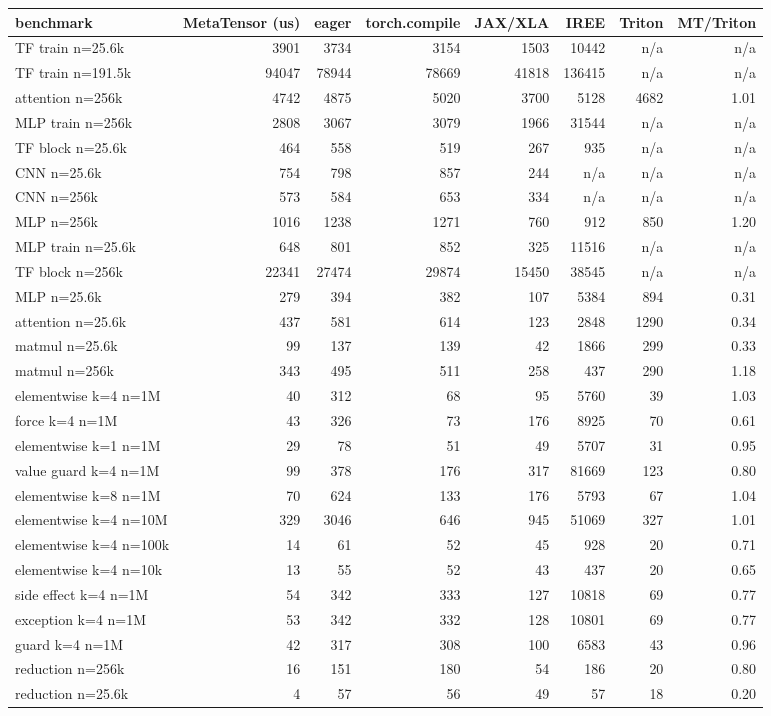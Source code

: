 \begin{tabular}{lrrrrrrr}
\toprule
benchmark & MetaTensor (us) & eager & torch.compile & JAX/XLA & IREE & Triton & MT/Triton \\
\midrule
TF train n=25.6k & 3901 & 3734 & 3154 & 1503 & 10442 & n/a & n/a \\
TF train n=191.5k & 94047 & 78944 & 78669 & 41818 & 136415 & n/a & n/a \\
attention n=256k & 4742 & 4875 & 5020 & 3700 & 5128 & 4682 & 1.01 \\
MLP train n=256k & 2808 & 3067 & 3079 & 1966 & 31544 & n/a & n/a \\
TF block n=25.6k & 464 & 558 & 519 & 267 & 935 & n/a & n/a \\
CNN n=25.6k & 754 & 798 & 857 & 244 & n/a & n/a & n/a \\
CNN n=256k & 573 & 584 & 653 & 334 & n/a & n/a & n/a \\
MLP n=256k & 1016 & 1238 & 1271 & 760 & 912 & 850 & 1.20 \\
MLP train n=25.6k & 648 & 801 & 852 & 325 & 11516 & n/a & n/a \\
TF block n=256k & 22341 & 27474 & 29874 & 15450 & 38545 & n/a & n/a \\
MLP n=25.6k & 279 & 394 & 382 & 107 & 5384 & 894 & 0.31 \\
attention n=25.6k & 437 & 581 & 614 & 123 & 2848 & 1290 & 0.34 \\
matmul n=25.6k & 99 & 137 & 139 & 42 & 1866 & 299 & 0.33 \\
matmul n=256k & 343 & 495 & 511 & 258 & 437 & 290 & 1.18 \\
elementwise k=4 n=1M & 40 & 312 & 68 & 95 & 5760 & 39 & 1.03 \\
force k=4 n=1M & 43 & 326 & 73 & 176 & 8925 & 70 & 0.61 \\
elementwise k=1 n=1M & 29 & 78 & 51 & 49 & 5707 & 31 & 0.95 \\
value guard k=4 n=1M & 99 & 378 & 176 & 317 & 81669 & 123 & 0.80 \\
elementwise k=8 n=1M & 70 & 624 & 133 & 176 & 5793 & 67 & 1.04 \\
elementwise k=4 n=10M & 329 & 3046 & 646 & 945 & 51069 & 327 & 1.01 \\
elementwise k=4 n=100k & 14 & 61 & 52 & 45 & 928 & 20 & 0.71 \\
elementwise k=4 n=10k & 13 & 55 & 52 & 43 & 437 & 20 & 0.65 \\
side effect k=4 n=1M & 54 & 342 & 333 & 127 & 10818 & 69 & 0.77 \\
exception k=4 n=1M & 53 & 342 & 332 & 128 & 10801 & 69 & 0.77 \\
guard k=4 n=1M & 42 & 317 & 308 & 100 & 6583 & 43 & 0.96 \\
reduction n=256k & 16 & 151 & 180 & 54 & 186 & 20 & 0.80 \\
reduction n=25.6k & 4 & 57 & 56 & 49 & 57 & 18 & 0.20 \\
\bottomrule
\end{tabular}
